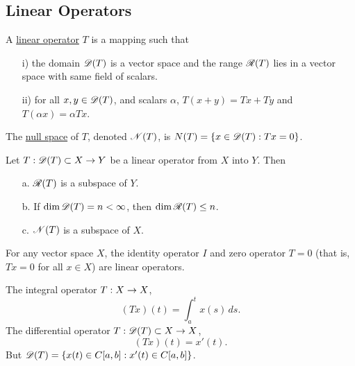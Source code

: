 \documentclass[]{article}
\begin{document}
\subsection*{Linear Operators}

\begin{definition}
	A \ul{linear operator} $T$ is a mapping such that
	\begin{enumerate}
		\item[i)] the domain $\mathscr{D}(T)$ is a vector space and the range $\mathscr{R}(T)$ lies in a vector space with same field of scalars.
		\item[ii)] for all $x,y\in \mathscr{D}(T)$, and scalars $\alpha$, $T(x+y) = Tx+Ty$ and $T(\alpha x) = \alpha Tx$.
	\end{enumerate}
\end{definition}
\begin{definition}
	The \ul{null space} of $T$, denoted $\mathscr{N}(T)$, is $N(T) = \left\{ x\in \mathscr{D}(T) : Tx=0 \right\}$.
\end{definition}
\begin{theorem}
	Let $T:\mathscr{D}(T)\subset X\rightarrow Y$ be a linear operator from $X$ into $Y$. Then
	\begin{enumerate}
		\item[a.] $\mathscr{R}(T)$ is a subspace of $Y$.
		\item[b.] If $\dim\mathscr{D}(T)=n<\infty$, then $\dim\mathscr{R}(T)\leq n$.
		\item[c.] $\mathscr{N}(T)$ is a subspace of $X$.
	\end{enumerate}
\end{theorem}
\begin{example}
	For any vector space $X$, the identity operator $I$ and zero operator $T=0$ (that is, $Tx=0$ for all $x\in X$) are linear operators.
\end{example}
\begin{example}
	[$X=C{[}a,b{]}$] The integral operator $T:X\rightarrow X$,
	$$(Tx)(t) = \int_a^tx(s)\,ds.$$
	The differential operator $T:\mathscr{D}(T)\subset X\rightarrow X$,
	$$ (Tx)(t) = x'(t).$$
	But $\mathscr{D}(T) = \left\{ x(t)\in C[a,b] : x'(t)\in C[a,b] \right\}$.
\end{example}
\end{document}
